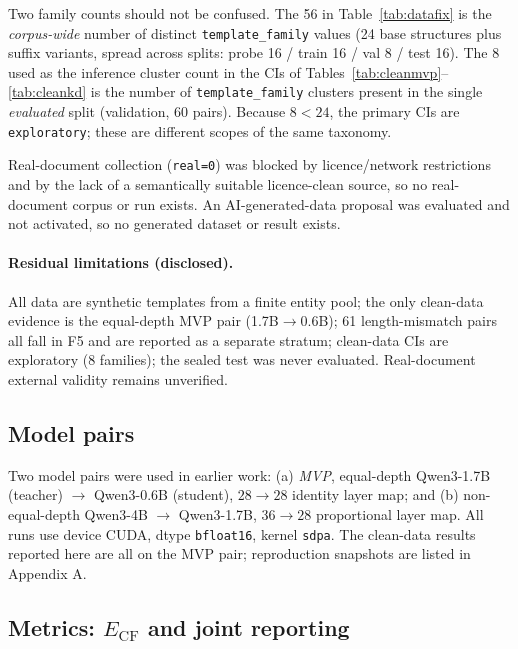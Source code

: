 \documentclass[11pt,a4paper]{article}
\begin{document}
Two family counts should not be confused. The 56 in
Table~\ref{tab:datafix} is the \emph{corpus-wide} number of distinct
\texttt{template\_family} values (24 base structures plus suffix variants,
spread across splits: probe 16 / train 16 / val 8 / test 16). The 8 used as the
inference cluster count in the CIs of
Tables~\ref{tab:cleanmvp}--\ref{tab:cleankd} is the number of
\texttt{template\_family} clusters present in the single \emph{evaluated}
split (validation, 60 pairs). Because $8<24$, the primary CIs are
\texttt{exploratory}; these are different scopes of the same taxonomy.

Real-document collection (\texttt{real=0}) was blocked by licence/network
restrictions and by the lack of a semantically suitable licence-clean source,
so no real-document corpus or run exists. An AI-generated-data proposal was
evaluated and not activated, so no generated dataset or result exists.

\paragraph{Residual limitations (disclosed).} All data are synthetic templates
from a finite entity pool; the only clean-data evidence is the equal-depth MVP
pair (1.7B$\to$0.6B); 61 length-mismatch pairs all fall in F5 and are reported
as a separate stratum; clean-data CIs are exploratory (8 families); the sealed
test was never evaluated. Real-document external validity remains unverified.

\subsection{Model pairs}
\label{sec:models}

Two model pairs were used in earlier work: (a) \emph{MVP}, equal-depth
Qwen3-1.7B (teacher) $\to$ Qwen3-0.6B (student), $28\to28$ identity layer map;
and (b) non-equal-depth Qwen3-4B $\to$ Qwen3-1.7B, $36\to28$ proportional layer
map. All runs use device CUDA, dtype \texttt{bfloat16}, kernel \texttt{sdpa}.
The clean-data results reported here are all on the MVP pair; reproduction
snapshots are listed in Appendix A.

\subsection{Metrics: $E_{\mathrm{CF}}$ and joint reporting}
\label{sec:metrics}
\end{document}
